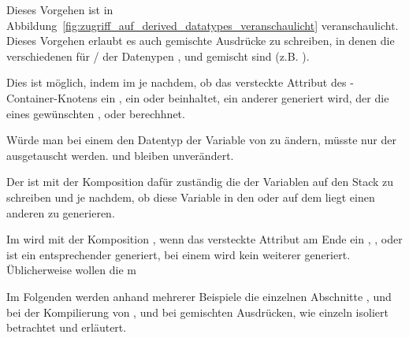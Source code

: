 Dieses Vorgehen ist in Abbildung~\ref{fig:zugriff_auf_derived_datatypes_veranschaulicht} veranschaulicht. Dieses Vorgehen erlaubt es auch gemischte Ausdrücke zu schreiben, in denen die verschiedenen  für  /  der Datenypen ,  und  gemischt sind (z.B. ).

Dies ist möglich, indem im  je nachdem, ob das \textcolor{gray!90!black}{versteckte Attribut}  des -Container-Knotens ein , ein  oder  beinhaltet, ein anderer  generiert wird, der die  eines gewünschten ,  oder  berechhnet.

Würde man bei einem  den Datentyp der Variable  von  zu  ändern, müsste nur der  ausgetauscht werden.  und  bleiben unverändert.

Der  ist mit der Komposition  dafür zuständig die  der Variablen  auf den Stack zu schreiben und je nachdem, ob diese Variable in den  oder auf dem  liegt einen anderen  zu generieren.

Im  wird mit der Komposition , wenn das \textcolor{gray!90!black}{versteckte Attribut}  am Ende ein , ,  oder  ist ein entsprechender  generiert, bei einem  wird kein weiterer  generiert. Üblicherweise wollen die m

Im Folgenden werden anhand mehrerer Beispiele die einzelnen Abschnitte ,  und  bei der Kompilierung von ,  und  bei gemischten Ausdrücken, wie  einzeln isoliert betrachtet und erläutert.

